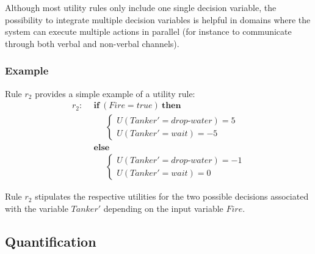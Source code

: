 Although most utility rules only include one single decision variable, the possibility to integrate multiple decision variables is helpful in domains where the system can execute multiple actions in parallel (for instance to communicate through both verbal and non-verbal channels). 
 
\subsubsection*{Example}

Rule $r_2$ provides a simple example of a utility rule:
\begin{align*}
r_2: \ \ & \textbf{if} \ (\mathit{Fire}\!=\!\mathit{true}) \ \textbf{then} \\
& \;\;\;\;\;  \begin{cases}
U(\mathit{Tanker}'\!=\!\mathit{drop\mbox{-}water}) = 5 \\
U(\mathit{Tanker}'\!=\!\mathit{wait}) = -5
\end{cases} \\
& \textbf{else} \\
& \;\;\;\;\; \begin{cases}
U (\mathit{Tanker}'\!=\!\mathit{drop\mbox{-}water}) = -1 \\
U(\mathit{Tanker}'\!=\!\mathit{wait}) = 0
\end{cases}
\end{align*}

Rule $r_2$ stipulates the respective utilities for the two possible decisions associated with the variable $\mathit{Tanker}'$ depending on the input variable $\mathit{Fire}$. 

\subsection{Quantification}
\label{sec:quantification}

